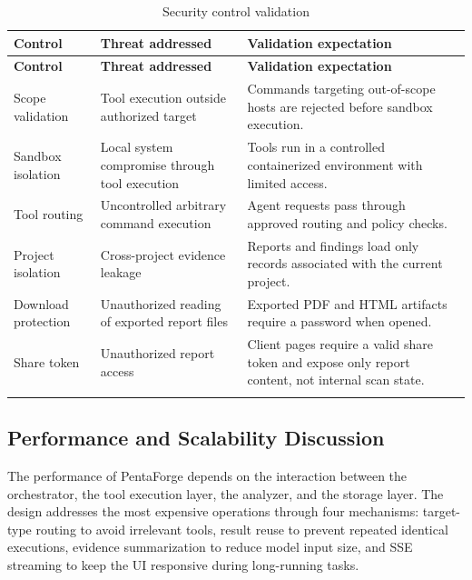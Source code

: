 \documentclass[12pt,a4paper]{report}
\begin{document}
\begin{longtable}{|p{}|p{}|p{}|}
\hline
\textbf{Control} & \textbf{Threat addressed} & \textbf{Validation expectation} \\
\hline
\endfirsthead
\hline
\textbf{Control} & \textbf{Threat addressed} & \textbf{Validation expectation} \\
\hline
\endhead
Scope validation & Tool execution outside authorized target & Commands targeting
out-of-scope hosts are rejected before sandbox execution. \\
\hline
Sandbox isolation & Local system compromise through tool execution & Tools run in
a controlled containerized environment with limited access. \\
\hline
Tool routing & Uncontrolled arbitrary command execution & Agent requests pass
through approved routing and policy checks. \\
\hline
Project isolation & Cross-project evidence leakage & Reports and findings load
only records associated with the current project. \\
\hline
Download protection & Unauthorized reading of exported report files & Exported PDF
and HTML artifacts require a password when opened. \\
\hline
Share token & Unauthorized report access & Client pages require a valid share token
and expose only report content, not internal scan state. \\
\hline
\caption{Security control validation}
\label{tab:security_control_validation}
\end{longtable}

\subsection{Performance and Scalability Discussion}

The performance of PentaForge depends on the interaction between the orchestrator,
the tool execution layer, the analyzer, and the storage layer. The design addresses
the most expensive operations through four mechanisms: target-type routing to avoid
irrelevant tools, result reuse to prevent repeated identical executions, evidence
summarization to reduce model input size, and SSE streaming to keep the UI responsive
during long-running tasks.
\end{document}
